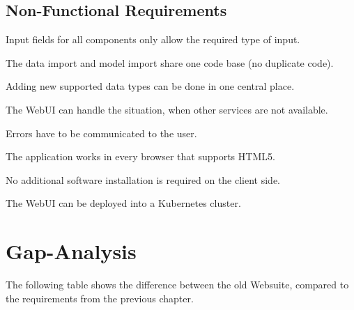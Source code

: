 \subsection{Non-Functional Requirements}
\reqstartNF
\item Input fields for all components only allow the required type of input.
\item The data import and model import share one code base (no duplicate code).
\item Adding new supported data types can be done in one central place.
\item The WebUI can handle the situation, when other services are not available.
\item Errors have to be communicated to the user.
\item The application works in every browser that supports HTML5.
\item No additional software installation is required on the client side.
\item The WebUI can be deployed into a Kubernetes cluster.
\reqendNF



\section{Gap-Analysis}
The following table shows the difference between the old Websuite, compared to the requirements from the previous chapter.

